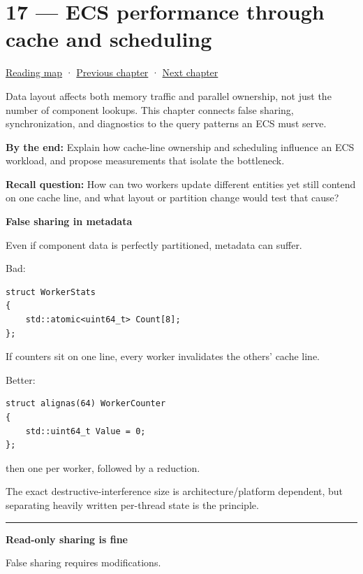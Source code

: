 \hypertarget{05-engine-i-ch017}{}
\section{17 --- ECS performance through cache and scheduling}\label{ecs-performance-through-cache-and-scheduling}

\href{Chapter\%20Edition/03\%20-\%20Game\%20Engine/00\%20-\%20Reading\%20Map}{Reading map} · \hyperref[05-engine-i-ch016]{Previous chapter} · \hyperref[05-engine-i-ch018]{Next chapter}

Data layout affects both memory traffic and parallel ownership, not just the number of component lookups. This chapter connects false sharing, synchronization, and diagnostics to the query patterns an ECS must serve.

\textbf{By the end:} Explain how cache-line ownership and scheduling influence an ECS workload, and propose measurements that isolate the bottleneck.

\textbf{Recall question:} How can two workers update different entities yet still contend on one cache line, and what layout or partition change would test that cause?

\textbf{False sharing in metadata}

Even if component data is perfectly partitioned, metadata can suffer.

Bad:

\begin{verbatim}
struct WorkerStats
{
    std::atomic<uint64_t> Count[8];
};
\end{verbatim}

If counters sit on one line, every worker invalidates the others' cache line.

Better:

\begin{verbatim}
struct alignas(64) WorkerCounter
{
    std::uint64_t Value = 0;
};
\end{verbatim}

then one per worker, followed by a reduction.

The exact destructive-interference size is architecture/platform dependent, but separating heavily written per-thread state is the principle.

\begin{center}\rule{0.5\linewidth}{0.5pt}\end{center}

\textbf{Read-only sharing is fine}

False sharing requires modifications.

